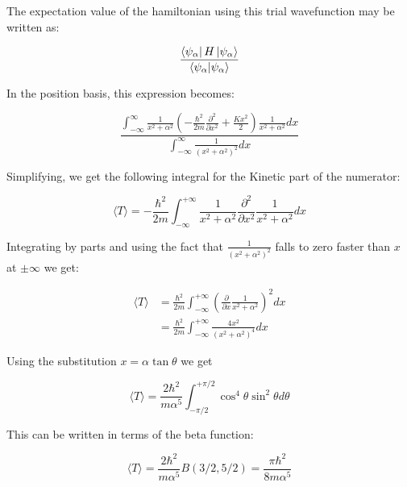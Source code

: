 \question
{}

The expectation value of the hamiltonian using this trial wavefunction may be
written as:

\begin{equation}
    \frac{\bra{\psi_\alpha} H \ket{\psi_\alpha}}{\braket{\psi_\alpha}{\psi_\alpha}}
\end{equation}

In the position basis, this expression becomes:

\begin{equation}
\frac{
    \int_{-\infty}^{\infty} \frac{1}{x^2 + \alpha^2} (-\frac{\hbar^2}{2m} \frac{\partial^2 }{\partial x^2} + \frac{K x^2}{2}) \frac{1}{x^2 + \alpha^2} dx
}
{\int_{-\infty}^{\infty}  \frac{1}{(x^2 + \alpha^2)^2} dx} 
\end{equation}

Simplifying, we get the following integral for the Kinetic part of the
numerator:

\begin{equation}
   \langle T \rangle = -\frac{\hbar^2}{2m}  \int_{-\infty}^{+\infty} \frac{1}{x^2 + \alpha^2} \frac{\partial^2 }{\partial x^2}  \frac{1}{x^2 + \alpha^2} dx
\end{equation}

Integrating by parts and using the fact that $\frac{1}{(x^2 + \alpha^2)^2}$
falls to zero faster than $x$ at $\pm \infty$ we get:

\begin{equation}
\begin{split}
   \langle T \rangle &= \frac{\hbar^2}{2m}  \int_{-\infty}^{+\infty}  (\frac{\partial }{\partial x}  \frac{1}{x^2 + \alpha^2})^2 dx \\
   &=  \frac{\hbar^2}{2m}  \int_{-\infty}^{+\infty}   \frac{4x^2}{(x^2 + \alpha^2)^4} dx
\end{split}
\end{equation}

Using the substitution $x = \alpha \tan \theta$ we get

\begin{equation}
     \langle T \rangle = \frac{2 \hbar^2}{m \alpha^5}  \int_{-\pi/2}^{+\pi/2} \cos^4 \theta \sin^2 \theta d \theta
\end{equation}

This can be written in terms of the beta function:

\begin{equation}
 \langle T \rangle = \frac{2 \hbar^2}{m \alpha^5} B(3/2 , 5/2) = \frac{\pi \hbar^2}{8 m \alpha^5}
\end{equation}

